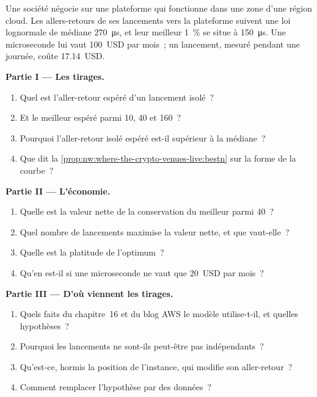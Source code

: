 \begin{problem}\label{pb:nw:where-the-crypto-venues-live:1}
Une société négocie sur une plateforme qui fonctionne dans une zone d'une région cloud. Les allers-retours de ses lancements vers la plateforme suivent une loi lognormale de médiane
\qty{270}{\micro\second}, et leur meilleur 1~\% se situe à \qty{150}{\micro\second}. Une microseconde lui vaut 100~USD par mois~; un lancement, mesuré pendant une journée, coûte
17.14~USD.

\medskip\noindent\textbf{Partie I --- Les tirages.}
\begin{enumerate}
\item Quel est l'aller-retour espéré d'un lancement isolé~?
\item Et le meilleur espéré parmi 10, 40 et 160~?
\item Pourquoi l'aller-retour isolé espéré est-il supérieur à la médiane~?
\item Que dit la \cref{prop:nw:where-the-crypto-venues-live:bestn} sur la forme de la courbe~?
\end{enumerate}

\medskip\noindent\textbf{Partie II --- L'économie.}
\begin{enumerate}[resume]
\item Quelle est la valeur nette de la conservation du meilleur parmi 40~?
\item Quel nombre de lancements maximise la valeur nette, et que vaut-elle~?
\item Quelle est la platitude de l'optimum~?
\item Qu'en est-il si une microseconde ne vaut que 20~USD par mois~?
\end{enumerate}

\medskip\noindent\textbf{Partie III --- D'où viennent les tirages.}
\begin{enumerate}[resume]
\item Quels faits du chapitre~16 et du blog AWS le modèle utilise-t-il, et quelles hypothèses~?
\item Pourquoi les lancements ne sont-ils peut-être pas indépendants~?
\item Qu'est-ce, hormis la position de l'instance, qui modifie son aller-retour~?
\item Comment remplacer l'hypothèse par des données~?
\end{enumerate}


\end{problem}
